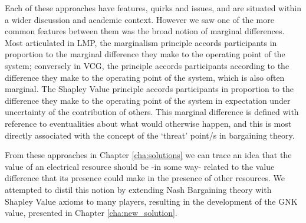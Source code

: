 Each of these approaches have features, quirks and issues, and are situated within a wider discussion and academic context. However we saw one of the more common features between them was the broad notion of marginal differences.
Most articulated in LMP, the marginalism principle accords participants in proportion to the marginal difference they make to the operating point of the system; conversely in VCG, the principle accords participants according to the difference they make to the operating point of the system, which is also often marginal.
The Shapley Value principle accords participants in proportion to the difference they make to the operating point of the system in expectation under uncertainty of the contribution of others.
This marginal difference is defined with reference to eventualities about what would otherwise happen, and this is most directly associated with the concept of the `threat' point/s in bargaining theory.

From these approaches in Chapter \ref{cha:solutions} we can trace an idea that the value of an electrical resource should be -in some way- related to the value difference that its presence could make in the presence of other resources.
We attempted to distil this notion by extending Nash Bargaining theory with Shapley Value axioms to many players, resulting in the development of the GNK value, presented in Chapter \ref{cha:new_solution}.

